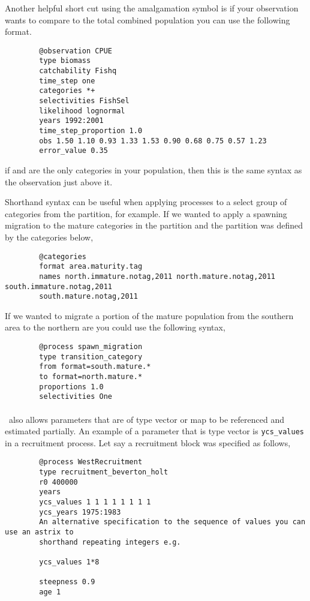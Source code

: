 Another helpful short cut using the amalgamation symbol \subcommand{+} is if your observation wants to compare to the total combined population you can use the following format.

{\small{\begin{verbatim}
		@observation CPUE
		type biomass
		catchability Fishq
		time_step one
		categories *+
		selectivities FishSel
		likelihood lognormal
		years 1992:2001
		time_step_proportion 1.0
		obs 1.50 1.10 0.93 1.33 1.53 0.90 0.68 0.75 0.57 1.23
		error_value 0.35
		\end{verbatim}}}

if  and  are the only categories in your population, then this is the same syntax as the observation just above it.

Shorthand syntax can be useful when applying processes to a select group of categories from the partition, for example. If we wanted to apply a spawning migration to the mature categories in the partition and the partition was defined by the categories below,
{\small{\begin{verbatim}
		@categories 
		format area.maturity.tag
		names north.immature.notag,2011 north.mature.notag,2011 south.immature.notag,2011
		south.mature.notag,2011		
		\end{verbatim}}}	

If we wanted to migrate a portion of the mature population from the southern area to the northern are you could use the following syntax,

{\small{\begin{verbatim}
		@process spawn_migration
		type transition_category 		
		from format=south.mature.*	
		to format=north.mature.*
		proportions 1.0
		selectivities One
		\end{verbatim}}}


\paragraph*{\label{sec:params}}
\CNAME\ also allows parameters that are of type vector or map to be referenced and estimated partially. An example of a parameter that is type vector is \texttt{ycs\_values} in a recruitment process. Let say a recruitment block was specified as follows,
{\small{\begin{verbatim}
		@process WestRecruitment
		type recruitment_beverton_holt
		r0 400000
		years
		ycs_values 1 1 1 1 1 1 1 1 
		ycs_years 1975:1983
		An alternative specification to the sequence of values you can use an astrix to
		shorthand repeating integers e.g.
		
		ycs_values 1*8
		
		steepness 0.9
		age 1
		\end{verbatim}}}

